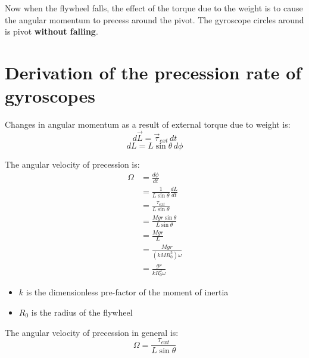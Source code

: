 \documentclass[11pt]{article}
\begin{document}
Now when the flywheel falls, the effect of the torque due to the weight is to cause the angular momentum to precess around the pivot. The gyroscope circles around is pivot \textbf{without falling}.

\newpage

\section{Derivation of the precession rate of gyroscopes}
\label{sec:orga86a666}
Changes in angular momentum as a result of external torque due to weight is:
\[d \vec{L} = \vec{\tau}_{ext} \, dt\]
\[dL = L \sin \theta \, d \phi\]

The angular velocity of precession is:
\begin{align*}
\Omega &= \frac{d \phi}{dt} \\
&= \frac{1}{L \sin \theta} \frac{dL}{dt} \\
&= \frac{\tau_{ext}}{L \sin \theta} \\
&= \frac{M gr \sin \theta}{L \sin \theta} \\
&= \frac{Mgr}{L} \\
&= \frac{Mgr}{(kMR_0^2) \omega} \\
&= \frac{gr}{kR_0^2 \omega}
\end{align*}

\begin{itemize}
\item \(k\) is the dimensionless pre-factor of the moment of inertia
\item \(R_0\) is the radius of the flywheel
\end{itemize}

The angular velocity of precession in general is:
\[\Omega = \frac{\tau_{ext}}{L \sin \theta}\]
\end{document}
